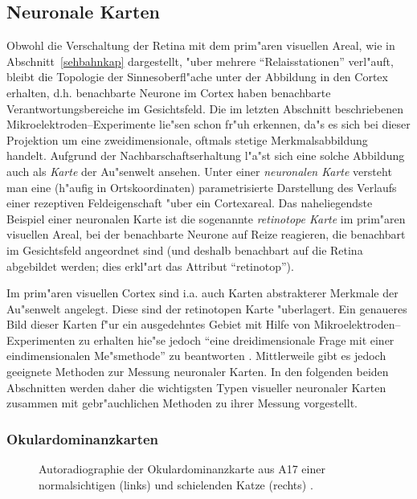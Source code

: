 \subsection{Neuronale Karten}

Obwohl die Verschaltung der Retina mit dem prim"aren visuellen Areal, wie
in Abschnitt~\ref{sehbahnkap} dargestellt, "uber mehrere
``Relaisstationen'' verl"auft, bleibt die Topologie der Sinnesoberfl"ache
unter der Abbildung in den Cortex erhalten, d.h.  benachbarte Neurone im
Cortex haben benachbarte Verantwortungsbereiche im Gesichtsfeld.  Die im
letzten Abschnitt beschriebenen Mikroelektroden--Experimente lie"sen schon
fr"uh erkennen, da"s es sich bei dieser Projektion um eine
zweidimensionale, oftmals stetige Merkmalsabbildung handelt.  Aufgrund der
Nachbarschaftserhaltung l"a"st sich eine solche Abbildung auch als
\emph{Karte} der Au"senwelt ansehen.  Unter einer \emph{neuronalen Karte}
versteht man eine (h"aufig in Ortskoordinaten) parametrisierte Darstellung
des Verlaufs einer rezeptiven Feldeigenschaft "uber ein Cortexareal.  Das
naheliegendste Beispiel einer neuronalen Karte ist die sogenannte
\emph{retinotope Karte} im prim"aren visuellen Areal, bei der benachbarte
Neurone auf Reize reagieren, die benachbart im Gesichtsfeld angeordnet sind
(und deshalb benachbart auf die Retina abgebildet werden; dies erkl"art das
Attribut ``retinotop'').

Im prim"aren visuellen Cortex sind i.a. auch Karten abstrakterer Merkmale der
\mbox{Au"senwelt} angelegt. Diese sind der retinotopen Karte "uberlagert. 
Ein genaueres Bild dieser Karten f"ur ein ausgedehntes Gebiet mit Hilfe von
Mikroelektroden--Experimenten zu erhalten hie"se jedoch ``eine
dreidimensionale Frage mit einer eindimensionalen Me"smethode'' zu
beantworten \cite{hubel:1989}.  Mittlerweile gibt es jedoch geeignete
Methoden zur Messung neuronaler Karten. In den folgenden beiden Abschnitten
werden daher die wichtigsten Typen visueller neuronaler Karten zusammen mit
gebr"auchlichen Methoden zu ihrer Messung vorgestellt.

\subsubsection{Okulardominanzkarten}
\label{odkarten}

\begin{figure}[t]
\begin{center}
\begin{minipage}[m]{3.9cm}
\end{minipage}
\hskip2cm
\begin{minipage}[m]{3.9cm}
\end{minipage}
\end{center}
\caption{Autoradiographie der Okulardominanzkarte aus A17 einer
normalsichtigen (links) und schielenden Katze (rechts)
\protect{}.}
\label{odsiegrid}
\end{figure}

